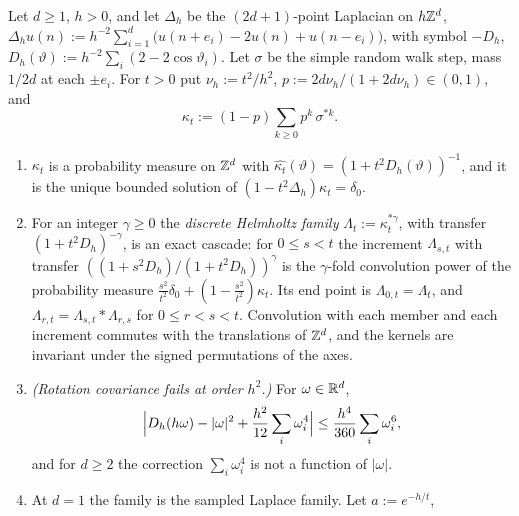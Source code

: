 \begin{proposition}
\label{prop:discrete-helmholtz}
\leanok
Let $d \ge 1$, $h > 0$, and let $\Delta_h$ be the $(2d+1)$-point Laplacian on $h\mathbb{Z}^d$,
$\Delta_hu(n) := h^{-2}\sum_{i=1}^d\bigl(u(n+e_i) - 2u(n) + u(n-e_i)\bigr)$, with symbol $-D_h$,
$D_h(\vartheta) := h^{-2}\sum_i(2 - 2\cos\vartheta_i)$. Let $\sigma$ be the simple random walk step,
mass $1/2d$ at each $\pm e_i$. For $t > 0$ put $\nu_h := t^2/h^2$,
$p := 2d\nu_h/(1+2d\nu_h) \in (0,1)$, and
\[
  \kappa_t := (1-p)\sum_{k \ge 0}p^k\,\sigma^{*k} .
\]
\begin{enumerate}
\item $\kappa_t$ is a probability measure on $\mathbb{Z}^d$ with
$\widehat{\kappa_t}(\vartheta) = (1 + t^2D_h(\vartheta))^{-1}$, and it is the unique bounded
solution of $(1 - t^2\Delta_h)\kappa_t = \delta_0$.
\item For an integer $\gamma \ge 0$ the \emph{discrete Helmholtz family}
$\Lambda_t := \kappa_t^{*\gamma}$, with transfer $(1 + t^2D_h)^{-\gamma}$, is an exact cascade: for
$0 \le s < t$ the increment $\Lambda_{s,t}$ with transfer $((1 + s^2D_h)/(1 + t^2D_h))^{\gamma}$ is the
$\gamma$-fold convolution power of the probability measure
$\tfrac{s^2}{t^2}\delta_0 + (1 - \tfrac{s^2}{t^2})\kappa_t$. Its end point is
$\Lambda_{0,t} = \Lambda_t$, and $\Lambda_{r,t} = \Lambda_{s,t} * \Lambda_{r,s}$ for
$0 \le r < s < t$. Convolution with each
member and each increment commutes with the translations of $\mathbb{Z}^d$, and the kernels are invariant
under the signed permutations of the axes.
\item \emph{(Rotation covariance fails at order $h^2$.)} For $\omega \in \mathbb{R}^d$,
\[
  \Bigl|D_h(h\omega) - |\omega|^2 + \frac{h^2}{12}\sum_i\omega_i^4\Bigr|
  \le \frac{h^4}{360}\sum_i\omega_i^6 ,
\]
and for $d \ge 2$ the correction $\sum_i\omega_i^4$ is not a function of $|\omega|$.
\item At $d = 1$ the family is the sampled Laplace family. Let $a := e^{-h/t}$,

\end{enumerate}
\end{proposition}
